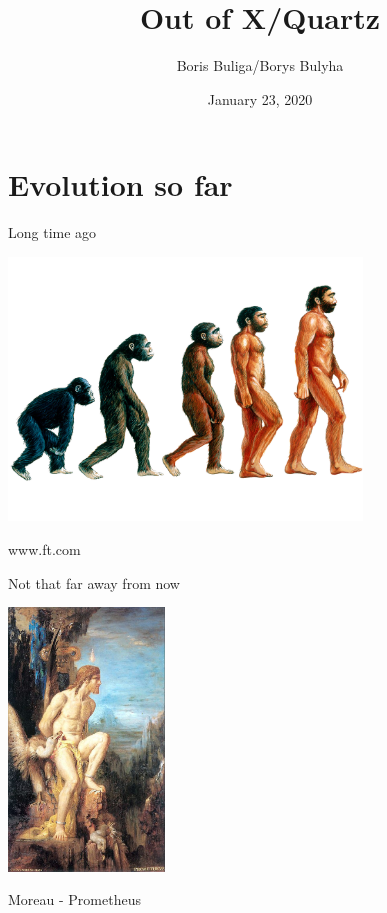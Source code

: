 \documentclass[presentation,aspectratio=169,smaller]{beamer}
\author{Boris Buliga/Borys Bulyha}
\date{January 23, 2020}
\title{Out of X/Quartz}
\begin{document}
\maketitle
\newcommand{\mathcolorbox}[2]{%
  \begingroup
  \setlength{\fboxsep}{2pt}%
  \colorbox{#1}{$\displaystyle #2$}%
  \endgroup
}


\section{Evolution so far}
\label{sec:org285f042}

\begin{frame}[label={sec:org0693cef}]{Long time ago}
\begin{center}
\includegraphics[height=7.0cm]{images/evolution-1.png}
\end{center}

\scriptsize{www.ft.com}
\end{frame}

\begin{frame}[label={sec:org79d04b5}]{Not that far away from now}
\begin{center}
\includegraphics[height=7.0cm]{images/evolution-2.png}
\end{center}

\scriptsize{Moreau - Prometheus}
\end{frame}
\end{document}

